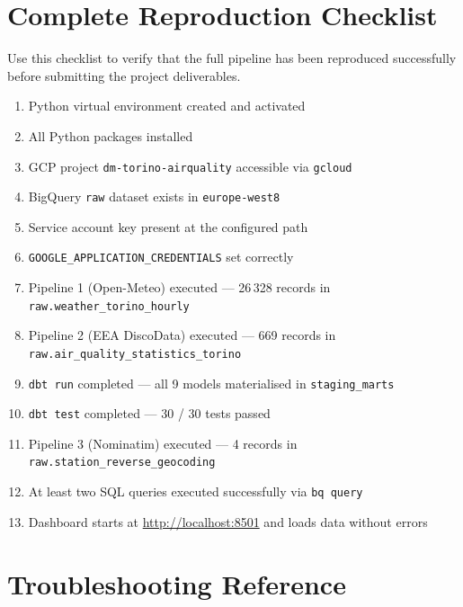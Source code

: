 \documentclass[11pt,a4paper]{article}
\begin{document}
\section{Complete Reproduction Checklist}

\begin{tcolorbox}[infobox]
Use this checklist to verify that the full pipeline has been reproduced successfully
before submitting the project deliverables.
\end{tcolorbox}

\begin{enumerate}[label=\textbf{\arabic*.},leftmargin=28pt]
  \item[$\square$] Python virtual environment created and activated
  \item[$\square$] All Python packages installed
  \item[$\square$] GCP project \texttt{dm-torino-airquality} accessible via \texttt{gcloud}
  \item[$\square$] BigQuery \texttt{raw} dataset exists in \texttt{europe-west8}
  \item[$\square$] Service account key present at the configured path
  \item[$\square$] \texttt{GOOGLE\_APPLICATION\_CREDENTIALS} set correctly
  \item[$\square$] Pipeline 1 (Open-Meteo) executed — 26\,328 records in \texttt{raw.weather\_torino\_hourly}
  \item[$\square$] Pipeline 2 (EEA DiscoData) executed — 669 records in \texttt{raw.air\_quality\_statistics\_torino}
  \item[$\square$] \texttt{dbt run} completed — all 9 models materialised in \texttt{staging\_marts}
  \item[$\square$] \texttt{dbt test} completed — 30 / 30 tests passed
  \item[$\square$] Pipeline 3 (Nominatim) executed — 4 records in \texttt{raw.station\_reverse\_geocoding}
  \item[$\square$] At least two SQL queries executed successfully via \texttt{bq query}
  \item[$\square$] Dashboard starts at \url{http://localhost:8501} and loads data without errors
\end{enumerate}

\section{Troubleshooting Reference}
\end{document}
